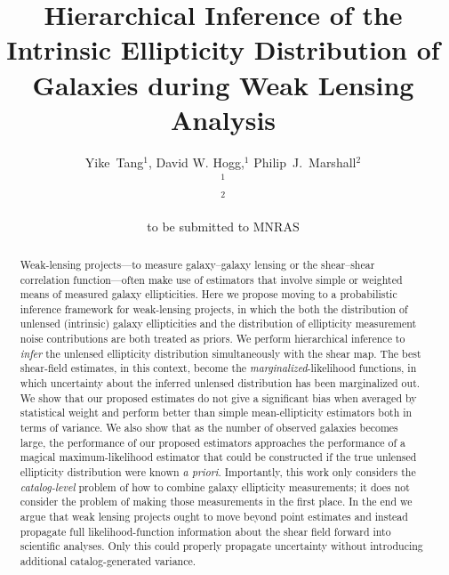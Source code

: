 \documentclass[useAMS,usenatbib]{mn2e}
\title[Hierarchical Inference in Weak Lensing]
{Hierarchical Inference of the Intrinsic Ellipticity
Distribution of Galaxies during Weak Lensing Analysis}
\author[Tang et al]{%
  Yike~Tang$^{1}$,
  David W. Hogg,$^{1}$
  Philip~J.~Marshall$^{2}$
  \medskip\\
  $^1$\nyu\\
  $^2$\oxford
}
\begin{document}
             
\date{to be submitted to MNRAS}
             
\pagerange{\pageref{firstpage}--\pageref{lastpage}}

\maketitle           

\label{firstpage}


\begin{abstract}
Weak-lensing projects---to measure galaxy--galaxy lensing or the shear--shear
correlation function---often make use of estimators that involve simple or weighted
means of measured galaxy ellipticities.  Here we propose moving to a probabilistic inference
framework for weak-lensing projects, in which the both the distribution of unlensed
(intrinsic) galaxy ellipticities and the distribution of ellipticity measurement noise contributions
are both treated as priors.  We perform hierarchical inference to \emph{infer} the
unlensed ellipticity distribution simultaneously with the shear map.  The best
shear-field estimates, in this context, become the \emph{marginalized}-likelihood functions, in which uncertainty about the
inferred unlensed distribution has been marginalized out.  We show that our proposed
estimates do not give a significant bias when averaged by statistical weight and perform better than simple mean-ellipticity estimators both in terms of variance.  We also show that as the number of observed galaxies becomes
large, the performance of our proposed estimators approaches the performance of a
magical maximum-likelihood estimator that could be constructed if the true unlensed
ellipticity distribution were known \textit{a priori}.  Importantly, this work only
considers the \emph{catalog-level} problem of how to combine galaxy ellipticity
measurements; it does not consider the problem of making those measurements in the
first place.  In the end we argue that weak lensing projects ought to move beyond
point estimates and instead propagate full likelihood-function information about
the shear field forward into scientific analyses. Only this could properly
propagate uncertainty without introducing additional catalog-generated variance.
\end{abstract}

\end{document}
